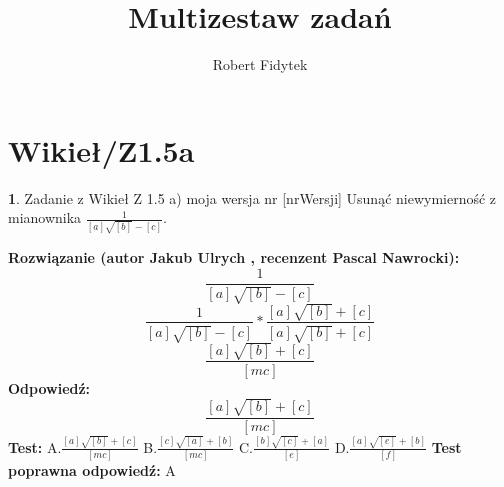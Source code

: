 \documentclass[12pt, a4paper]{article}
\title{Multizestaw zadań}
\author{Robert Fidytek}
\date{}
\theoremstyle{definition} %
\newtheorem{zad}{}
\newcommand{\kategoria}[1]{\section{#1}} %
\newcommand{\zadStart}[1]{\begin{zad}#1\newline} %
\newcommand{\zadStop}{\end{zad}}   %
\newcommand{\rozwStart}[2]{\noindent \textbf{Rozwiązanie (autor #1 , recenzent #2): }\newline} %
\newcommand{\rozwStop}{\newline}                                            %
\newcommand{\odpStart}{\noindent \textbf{Odpowiedź:}\newline}    %
\newcommand{\odpStop}{\newline}                                             %
\newcommand{\testStart}{\noindent \textbf{Test:}\newline} %
\newcommand{\testStop}{\newline} %
\newcommand{\kluczStart}{\noindent \textbf{Test poprawna odpowiedź:}\newline} %
\newcommand{\kluczStop}{\newline} %
\begin{document}
\maketitle


\kategoria{Wikieł/Z1.5a}
\zadStart{Zadanie z Wikieł Z 1.5 a) moja wersja nr [nrWersji]}
Usunąć niewymierność z mianownika $\frac{1}{[a]\sqrt{[b]}-[c]}$.
\zadStop
\rozwStart{Jakub Ulrych}{Pascal Nawrocki}
$$\frac{1}{[a]\sqrt{[b]}-[c]}$$
$$\frac{1}{[a]\sqrt{[b]}-[c]}*\frac{[a]\sqrt{[b]}+[c]}{[a]\sqrt{[b]}+[c]}$$
$$\frac{[a]\sqrt{[b]}+[c]}{[mc]}$$
\rozwStop
\odpStart
$$\frac{[a]\sqrt{[b]}+[c]}{[mc]}$$
\odpStop
\testStart
A.$\frac{[a]\sqrt{[b]}+[c]}{[mc]}$
B.$\frac{[c]\sqrt{[a]}+[b]}{[mc]}$
C.$\frac{[b]\sqrt{[c]}+[a]}{[e]}$
D.$\frac{[a]\sqrt{[e]}+[b]}{[f]}$
\testStop
\kluczStart
A
\kluczStop
\end{document}
